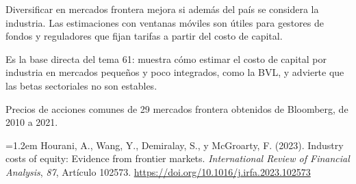 \documentclass{article}
\newcommand{\cardtitlesize}{\fontsize{30.7}{36.8}\selectfont}
\newcommand{\smallsize}{\fontsize{21.3}{27.7}\selectfont}
\newcommand{\cardtitle}[2][navy]{{\color{#1}\cardtitlesize\bfseries\textls[110]{\MakeUppercase{#2}}}\par\vspace{7mm}}
\begin{document}
\vfill
\hspace*{34mm}\begin{minipage}{773mm}
\begin{tcbraster}[raster columns=3, raster equal height, raster column skip=16mm]
\begin{tcolorbox}[card, raster multicolumn=2]\cardtitle{Conclusiones}Diversificar en mercados frontera mejora si además del país se considera la industria. Las estimaciones con ventanas móviles son útiles para gestores de fondos y reguladores que fijan tarifas a partir del costo de capital.\end{tcolorbox}
\begin{tcolorbox}[card=gold, colback=goldSoft]\cardtitle{Aporte al tema 61}Es la base directa del tema 61: muestra cómo estimar el costo de capital por industria en mercados pequeños y poco integrados, como la BVL, y advierte que las betas sectoriales no son estables.\end{tcolorbox}
\end{tcbraster}
\end{minipage}

\vfill
\begin{tcolorbox}[enhanced, sharp corners, colback=navy, boxrule=0pt, width=\paperwidth,
  left=34mm, right=34mm, top=14mm, bottom=11mm,
  overlay={\fill[gold] (frame.north west) rectangle ([yshift=-5mm]frame.north east);}]
\begin{minipage}[c]{245mm}\raggedright
{\color{acento}\smallsize\bfseries{}}\par\vspace{5mm}
{\color{white}\smallsize Precios de acciones comunes de 29 mercados frontera obtenidos de Bloomberg, de 2010 a 2021.}
\end{minipage}\hfill
\begin{minipage}[c]{385mm}\raggedright
{\color{acento}\smallsize\bfseries{}}\par\vspace{5mm}
{\color{white}\smallsize\hangindent=1.2em Hourani, A., Wang, Y., Demiralay, S., y McGroarty, F. (2023). Industry costs of equity: Evidence from frontier markets. \textit{International Review of Financial Analysis}, \textit{87}, Artículo 102573. \url{https://doi.org/10.1016/j.irfa.2023.102573}\par}
\end{minipage}\hfill
\begin{minipage}[c]{100mm}\centering
{}\par\vspace{4mm}
{\color{acento}\fontsize{17}{21}\selectfont\bfseries{}}
\end{minipage}
\end{tcolorbox}
\end{document}
